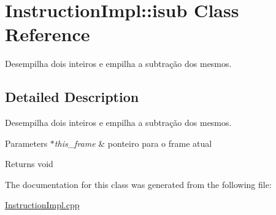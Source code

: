 \hypertarget{class_instruction_impl_1_1isub}{}\section{Instruction\+Impl\+:\+:isub Class Reference}
\label{class_instruction_impl_1_1isub}


Desempilha dois inteiros e empilha a subtração dos mesmos.  




\subsection{Detailed Description}
Desempilha dois inteiros e empilha a subtração dos mesmos. 


\begin{DoxyParams}{Parameters}
{\em $\ast$this\+\_\+frame} & ponteiro para o frame atual \\
\hline
\end{DoxyParams}
\begin{DoxyReturn}{Returns}
void 
\end{DoxyReturn}


The documentation for this class was generated from the following file\+:\begin{DoxyCompactItemize}
\item 
\hyperlink{_instruction_impl_8cpp}{Instruction\+Impl.\+cpp}\end{DoxyCompactItemize}

